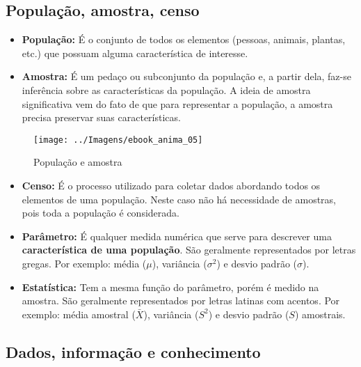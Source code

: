 \documentclass[12pt,]{style/krantz}
\theoremstyle{definition}
\theoremstyle{definition}
\theoremstyle{definition}
\theoremstyle{remark}
\begin{document}
\subsection{População, amostra, censo}\label{populacao-amostra-censo}

\begin{itemize}
\item
  \textbf{População:} É o conjunto de todos os elementos (pessoas,
  animais, plantas, etc.) que possuam alguma característica de
  interesse.
\item
  \textbf{Amostra:} É um pedaço ou subconjunto da população e, a partir
  dela, faz-se inferência sobre as características da população. A ideia
  de amostra significativa vem do fato de que para representar a
  população, a amostra precisa preservar suas características.
\end{itemize}

\begin{figure}[H]

{\centering \texttt{[image: ../Imagens/ebook\_anima\_05]} 

}

\caption{População e amostra}\label{fig:fig05}
\end{figure}

\begin{itemize}
\item
  \textbf{Censo:} É o processo utilizado para coletar dados abordando
  todos os elementos de uma população. Neste caso não há necessidade de
  amostras, pois toda a população é considerada.
\item
  \textbf{Parâmetro: } É qualquer medida numérica que serve para
  descrever uma \textbf{característica de uma população}. São geralmente
  representados por letras gregas. Por exemplo: média (\(\mu\)),
  variância (\(\sigma^2\)) e desvio padrão (\(\sigma\)).
\item
  \textbf{Estatística: } Tem a mesma função do parâmetro, porém é medido
  na amostra. São geralmente representados por letras latinas com
  acentos. Por exemplo: média amostral (\(\bar X\)), variância (\(S^2\))
  e desvio padrão (\(S\)) amostrais.
\end{itemize}

\subsection{Dados, informação e
conhecimento}\label{dados-informacao-e-conhecimento}
\end{document}
